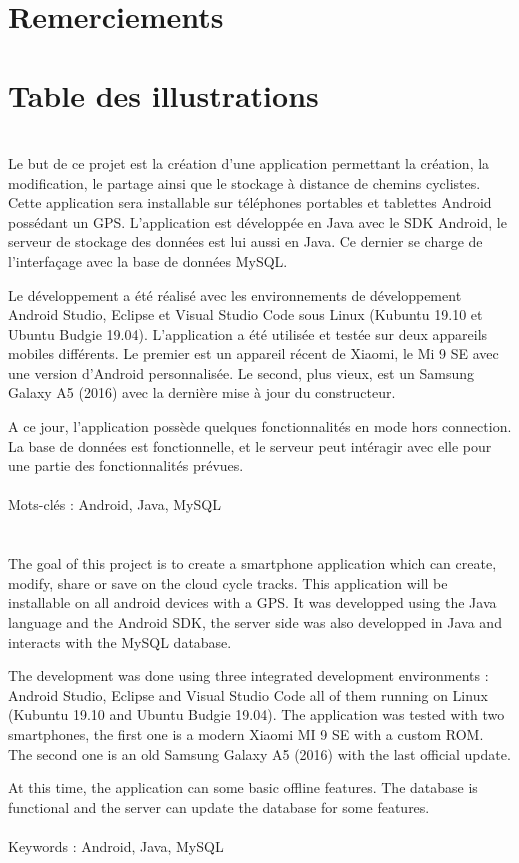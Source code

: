 \documentclass[a4paper, 12pt]{report}
\begin{document}
\section*{Remerciements}
\section*{Table des illustrations}
\newpage
\section*{}
	\indent
	Le but de ce projet est la création d'une application permettant la création, la modification, le partage ainsi que le stockage à distance de chemins cyclistes. 
	Cette application sera installable sur téléphones portables et tablettes Android possédant un GPS. L'application est développée en Java avec le SDK Android, le serveur de stockage des données est lui aussi en Java.
	Ce dernier se charge de l'interfaçage avec la base de données MySQL.
	\\\par
	Le développement a été réalisé avec les environnements de développement Android Studio, Eclipse et Visual Studio Code sous Linux (Kubuntu 19.10 et Ubuntu Budgie 19.04). L'application a été utilisée et testée sur deux appareils mobiles différents.
	Le premier est un appareil récent de Xiaomi, le Mi 9 SE avec une version d'Android personnalisée.
	Le second, plus vieux, est un Samsung Galaxy A5 (2016) avec la dernière mise à jour du constructeur.
	\\\par
	A ce jour, l'application possède quelques fonctionnalités en mode hors connection.
	La base de données est fonctionnelle, et le serveur peut intéragir avec elle pour une partie des fonctionnalités prévues.
	\\\\
	Mots-clés : Android, Java, MySQL
\section*{}
\indent
  The goal of this project is to create a smartphone application which can create, modify, share or save on the cloud cycle tracks. 
  This application will be installable on all android devices with a GPS. 
  It was developped using the Java language and the Android SDK, the server side was also developped in Java and interacts with the MySQL database.
  \\\par
  The development was done using three integrated development environments : Android Studio, Eclipse and Visual Studio Code all of them running on Linux (Kubuntu 19.10 and Ubuntu Budgie 19.04).
  The application was tested with two smartphones, the first one is a modern Xiaomi MI 9 SE with a custom ROM. The second one is an old Samsung Galaxy A5 (2016) with the last official update.
  \\\par
  At this time, the application can some basic offline features. The database is functional and the server can update the database for some features.
  \\\\
  Keywords : Android, Java, MySQL
\newpage
\end{document}
